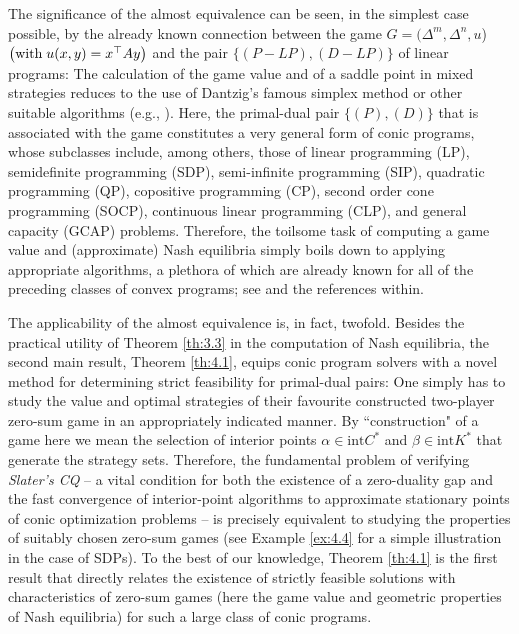\documentclass[11pt, twoside]{article}
\numberwithin{equation}{section}
\theoremstyle{definition}
\begin{document}
The significance of the almost equivalence can be seen, in the simplest case possible, by the already known connection between the game $G=(\Delta^m,\Delta^n,u$) $\left(\text{with\;}u(x,y)=x^{\top}Ay\right)$ and the pair \hyperlink{LPS}{$\{(P-LP),(D-LP)\}$} of linear programs: The calculation of the game value and of a saddle point in mixed strategies reduces to the use of Dantzig's famous simplex method \cite{dantzig1956constructive, dantzig2016linear} or other suitable algorithms (e.g., \cite{karmarkar1984new}). Here, the primal-dual pair \hyperlink{primaldual}{$\{(P),(D)\}$} that is associated with the game constitutes a very general form of conic programs, whose subclasses include, among others, those of linear programming (LP), semidefinite programming (SDP), semi-infinite programming (SIP), quadratic programming (QP), copositive programming (CP), second order cone programming (SOCP), continuous linear programming (CLP), and general capacity (GCAP) problems. Therefore, the toilsome task of computing a game value and (approximate) Nash equilibria simply boils down to applying appropriate algorithms, a plethora of which are already known for all of the preceding classes of convex programs; see \cite{alizadeh2003second,anderson1989capacity,  dantzig2016linear, karmarkar1984new, lai1992extremal, levinson1966class, nesterov1994interior, nocedal1999numerical, shapiro2009semi, weiss2008simplex, wolkowicz2012handbook} and the references within.\par
The applicability of the almost equivalence is, in fact, twofold. Besides the practical utility of Theorem \ref{th:3.3} in the computation of Nash equilibria, the second main result, Theorem \ref{th:4.1}, equips conic program solvers with a novel method for determining strict feasibility for primal-dual pairs: One simply has to study the value and optimal strategies of their favourite constructed two-player zero-sum game in an appropriately indicated manner. By ``construction" of a game here we mean the selection of interior points $\alpha\in\text{int}C^*$ and $\beta\in\text{int}K^*$ that generate the strategy sets. Therefore, the fundamental problem of verifying \textit{Slater's CQ} -- a vital condition for both the existence of a zero-duality gap \cite{anderson1983review, bonnans2013perturbation, nash1987linear, shapiro2001duality} and the fast convergence of interior-point algorithms to approximate stationary points \cite{nesterov1994interior, nocedal1999numerical, wolkowicz2012handbook} of conic optimization problems -- is precisely equivalent to studying the properties of suitably chosen zero-sum games (see Example \ref{ex:4.4} for a simple illustration in the case of SDPs). To the best of our knowledge, Theorem \ref{th:4.1} is the first result that directly relates the existence of strictly feasible solutions with characteristics of zero-sum games (here the game value and geometric properties of Nash equilibria) for such a large class of conic programs.
\end{document}
